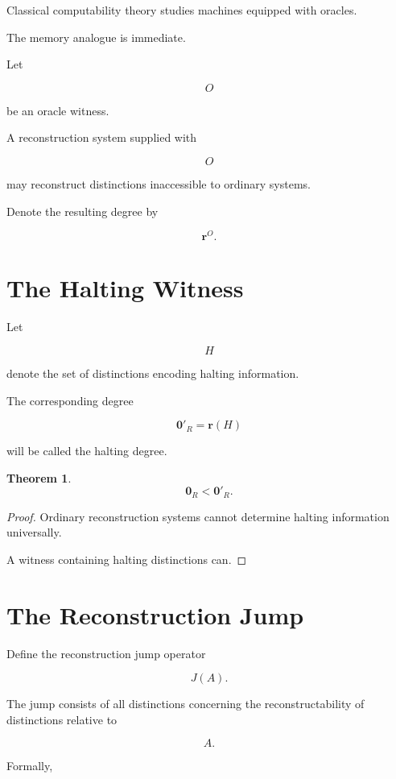 \documentclass[12pt,oneside]{book}
\theoremstyle{plain} \newtheorem{theorem}{Theorem}[chapter] \newtheorem{lemma}[theorem]{Lemma} \newtheorem{proposition}[theorem]{Proposition} \newtheorem{corollary}[theorem]{Corollary}
\theoremstyle{definition} \newtheorem{definition}[theorem]{Definition} \newtheorem{axiom}[theorem]{Axiom} \newtheorem{construction}[theorem]{Construction}
\theoremstyle{remark} \newtheorem{remark}[theorem]{Remark} \newtheorem{example}[theorem]{Example}
\begin{document}
Classical computability theory studies machines equipped with oracles.

The memory analogue is immediate.

Let

\[
O
\]

be an oracle witness.

A reconstruction system supplied with

\[
O
\]

may reconstruct distinctions inaccessible to ordinary systems.

Denote the resulting degree by

\[
\mathbf r^O.
\]

\section{The Halting Witness}

Let

\[
H
\]

denote the set of distinctions encoding halting information.

The corresponding degree

\[
\mathbf 0'_R
=
\mathbf r(H)
\]

will be called the halting degree.

\begin{theorem}

\[
\mathbf 0_R
<
\mathbf 0'_R.
\]

\end{theorem}

\begin{proof}

Ordinary reconstruction systems cannot determine halting information universally.

A witness containing halting distinctions can.

\end{proof}

\section{The Reconstruction Jump}

Define the reconstruction jump operator

\[
J(A).
\]

The jump consists of all distinctions concerning the reconstructability of distinctions relative to

\[
A.
\]

Formally,
\end{document}
